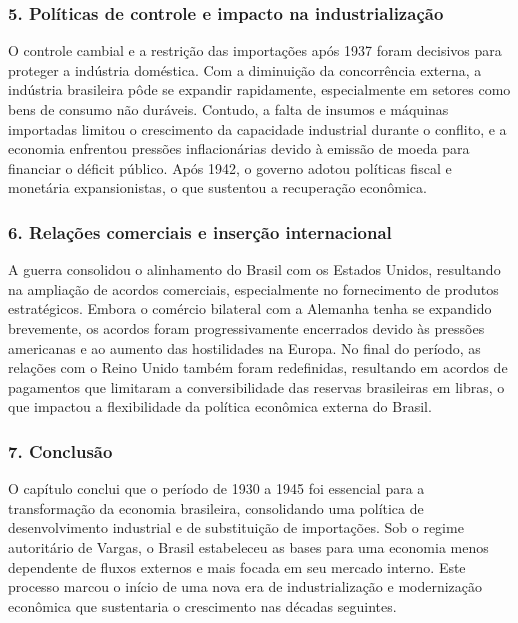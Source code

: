 \documentclass[a4paper,12pt]{article}[abntex2]
\begin{document}
\subsubsection{\textbf{5. Políticas de controle e impacto na industrialização}}

O controle cambial e a restrição das importações após 1937 foram decisivos para proteger a indústria doméstica. Com a diminuição da concorrência externa, a indústria brasileira pôde se expandir rapidamente, especialmente em setores como bens de consumo não duráveis. Contudo, a falta de insumos e máquinas importadas limitou o crescimento da capacidade industrial durante o conflito, e a economia enfrentou pressões inflacionárias devido à emissão de moeda para financiar o déficit público. Após 1942, o governo adotou políticas fiscal e monetária expansionistas, o que sustentou a recuperação econômica.

\subsubsection{\textbf{6. Relações comerciais e inserção internacional}}

A guerra consolidou o alinhamento do Brasil com os Estados Unidos, resultando na ampliação de acordos comerciais, especialmente no fornecimento de produtos estratégicos. Embora o comércio bilateral com a Alemanha tenha se expandido brevemente, os acordos foram progressivamente encerrados devido às pressões americanas e ao aumento das hostilidades na Europa. No final do período, as relações com o Reino Unido também foram redefinidas, resultando em acordos de pagamentos que limitaram a conversibilidade das reservas brasileiras em libras, o que impactou a flexibilidade da política econômica externa do Brasil.

\subsubsection{\textbf{7. Conclusão}}

O capítulo conclui que o período de 1930 a 1945 foi essencial para a transformação da economia brasileira, consolidando uma política de desenvolvimento industrial e de substituição de importações. Sob o regime autoritário de Vargas, o Brasil estabeleceu as bases para uma economia menos dependente de fluxos externos e mais focada em seu mercado interno. Este processo marcou o início de uma nova era de industrialização e modernização econômica que sustentaria o crescimento nas décadas seguintes.
\end{document}
